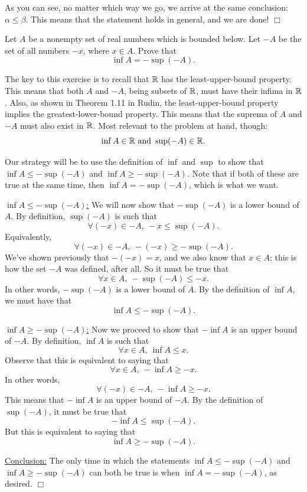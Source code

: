 As you can see, no matter which way we go, we arrive at the same conclusion: $\alpha \leq \beta$.
This means that the statement holds in general, and we are done!
$\Box$


\newpage
{}
Let $A$ be a nonempty set of real numbers which is bounded below.
Let $-A$ be the set of all numbers $-x$, where $x \in A$.
Prove that
$$\inf A = -\sup (-A).$$

\vspace{2mm}
\solve
The key to this exercise is to recall that $\mathbb{R}$ has the least-upper-bound property.
This means that both $A$ and $-A$, being subsets of $\mathbb{R}$, must have their infima in $\mathbb{R}$.
Also, as shown in Theorem 1.11 in Rudin, the least-upper-bound property implies the greatest-lower-bound property.
This means that the suprema of $A$ and $-A$ must also exist in $\mathbb{R}$.
Most relevant to the problem at hand, though: 
$$\inf A \in \mathbb{R} \text{ and } \sup (-A) \in \mathbb{R}.$$

Our strategy will be to use the definition of $\inf$ and $\sup$ to show that 
$\inf A \leq -\sup (-A)$ and $\inf A \geq -\sup (-A)$.
Note that if both of these are true at the same time, then $\inf A = -\sup (-A)$, which is what we want.

\vspace{2mm}
\noindent\underline{$\inf A \leq -\sup (-A)$:}
We will now show that $-\sup (-A)$ is a lower bound of $A$.
By definition, $\sup (-A)$ is such that
$$\forall (-x) \in -A,~ -x \leq \sup(-A).$$
Equivalently,
$$\forall (-x) \in -A,~ -(-x) \geq -\sup(-A).$$
We've shown previously that $-(-x) = x$, and we also know that $x \in A$;
this is how the set $-A$ was defined, after all.
So it must be true that
$$\forall x \in A,~ -\sup (-A) \leq -x.$$
In other words, $-\sup (-A)$ is a lower bound of $A$.
By the definition of $\inf A$, we must have that
$$\inf A \leq -\sup(-A).$$


\vspace{2mm}
\noindent
\underline{$\inf A \geq -\sup (-A)$:}
Now we proceed to show that $-\inf A$ is an upper bound of $-A$.
By definition, $\inf A$ is such that 
$$\forall x \in A,~ \inf A \leq x.$$
Observe that this is equivalent to saying that
$$\forall x \in A, ~ -\inf A \geq -x.$$
In other words, 
$$\forall (-x) \in -A, ~ -\inf A \geq -x.$$
This means that $-\inf A$ is an upper bound of $-A$.
By the definition of $\sup (-A)$, it must be true that
$$-\inf A \leq \sup (-A).$$
But this is equivalent to saying that
$$\inf A \geq -\sup (-A).$$

\vspace{2mm}
\noindent
\underline{Conclusion:} The only time in which the statements $\inf A \leq -\sup (-A)$ and $\inf A \geq -\sup (-A)$ can both be true is when $\inf A = -\sup (-A)$, as desired.
$\Box$